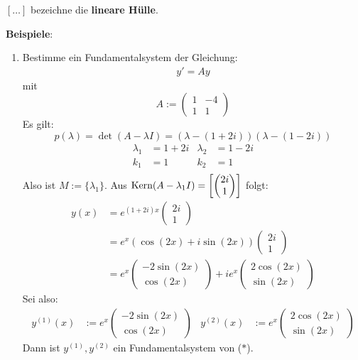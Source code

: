 \documentclass[a4paper,twoside,DIV15,BCOR12mm,chapterprefix=true,headings=twolinechapter]{scrbook}
\begin{document}
\begin{definition}
$ [\ldots] $ bezeichne die \textbf{lineare Hülle}.
\end{definition}

\textbf{Beispiele}:

\begin{enumerate}
\item Bestimme ein Fundamentalsystem der Gleichung:
\begin{align*}
\tag{$\ast $} y' = Ay
\end{align*}
mit 
\[A:=\begin{pmatrix} 1 & -4 \\ 1 & 1  \end{pmatrix}\]
Es gilt:
\[p(\lambda)=\det(A-\lambda I) = (\lambda - (1 + 2i))(\lambda-(1-2i))\]
\begin{align*}
\lambda_1 &= 1 + 2i &\lambda_2 &= 1-2i\\
k_1 &= 1 &k_2&=1\\
\end{align*}
Also ist $M := \{\lambda_1\}$. Aus $\mathop{\rm Kern}\nolimits(A-\lambda_1 I) = \left[ \begin{pmatrix} 2i \\ 1 \end{pmatrix} \right]$
folgt:
\begin{align*}
y(x) &= e^{(1+2i)x} \begin{pmatrix} 2i \\ 1 \end{pmatrix} \\ 
&= e^x (\cos(2x) + i \sin(2x)) \begin{pmatrix} 2i \\ 1 \end{pmatrix}\\ 
&= e^x \begin{pmatrix} -2\sin(2x) \\ \cos(2x) \end{pmatrix} 
+ ie^x \begin{pmatrix} 2\cos(2x) \\ \sin(2x) \end{pmatrix} 
\end{align*}
Sei also:
\begin{align*}
y^{(1)}(x)&:=e^x \begin{pmatrix} -2\sin(2x) \\ \cos(2x) \end{pmatrix}&
y^{(2)}(x)&:=e^x \begin{pmatrix} 2\cos(2x) \\ \sin(2x) \end{pmatrix}
\end{align*}
Dann ist $y^{(1)}, y^{(2)}$ ein Fundamentalsystem von ($\ast$).


\end{enumerate}
\end{document}
